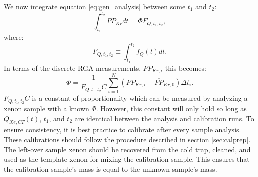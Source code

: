 We now integrate equation \ref{eq:gen_analysis} between some $t_1$ and $t_2$:
\begin{equation}
\int_{t_1}^{t_2}PP_{Kr}dt=\Phi F_{Q,t_1,t_2},
\end{equation}
where:
\begin{equation}
F_{Q,t_1,t_2}\equiv \int_{t_1}^{t_2}f_{Q}(t) dt.
\end{equation}
In terms of the discrete RGA measurements, $PP_{Kr,i}$ this becomes:
\begin{equation}
\label{eq:int_analysis}
\Phi=\frac{1}{F_{Q,t_1,t_2}C}\sum_{i=1}^{N} (PP_{Kr,i}-\overline{PP}_{Kr,0})\Delta t_i.
\end{equation}
$F_{Q,t_1,t_2}C$ is a constant of proportionality which can be measured by analyzing a xenon sample with a known $\Phi$. However, this constant will only hold so long as $Q_{Xe,CT}(t)$, $t_1$, and $t_2$ are identical between the analysis and calibration runs. To ensure consistency, it is best practice to calibrate after every sample analysis. These calibrations should follow the procedure described in section \ref{sec:calprep}. The left-over sample xenon should be recovered from the cold trap, cleaned, and used as the template xenon for mixing the calibration sample. This ensures that the calibration sample's mass is equal to the unknown sample's mass. 


